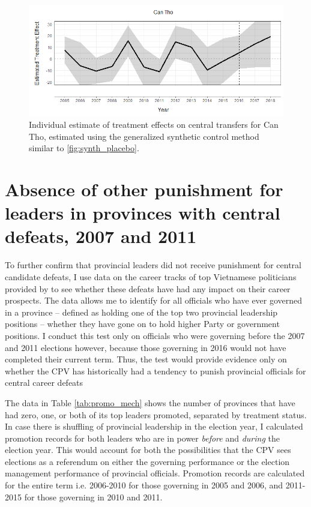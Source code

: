 \documentclass[12pt]{article}
\newcommand{\1}{\mathbbm{1}}
\begin{document}
\begin{figure}[!htbp]
	\centering
	\includegraphics[width=\textwidth]{figure/200205_synth_results_CanTho.png}
	\captionsetup{singlelinecheck=off}
	\caption[Individual synthetic control treatment effect]{Individual estimate of treatment effects on central transfers for Can Tho, estimated using the generalized synthetic control method similar to \autoref{fig:synth_placebo}.}
	\label{fig:synth_mech}
\end{figure}

\clearpage
\section{Absence of other punishment for leaders in provinces with central defeats, 2007 and 2011}
\label{app:punishment}

To further confirm that provincial leaders did not receive punishment for central candidate defeats, I use data on the career tracks of top Vietnamese politicians provided by \citet{MaleskyPhan2017} to see whether these defeats have had any impact on their career prospects. The data allows me to identify for all officials who have ever governed in a province -- defined as holding one of the top two provincial leadership positions -- whether they have gone on to hold higher Party or government positions. I conduct this test only on officials who were governing before the 2007 and 2011 elections however, because those governing in 2016 would not have completed their current term. Thus, the test would provide evidence only on whether the CPV has historically had a tendency to punish provincial officials for central career defeats

The data in Table \ref{tab:promo_mech} shows the number of provinces that have had zero, one, or both of its top leaders promoted, separated by treatment status. In case there is shuffling of provincial leadership in the election year, I calculated promotion records for both leaders who are in power \textit{before} and \textit{during} the election year. This would account for both the possibilities that the CPV sees elections as a referendum on either the governing performance or the election management performance of provincial officials. Promotion records are calculated for the entire term i.e. 2006-2010 for those governing in 2005 and 2006, and 2011-2015 for those governing in 2010 and 2011.
\end{document}
